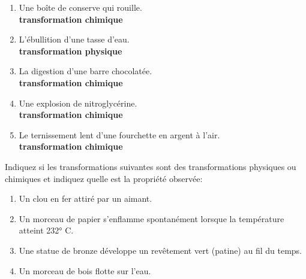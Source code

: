 \documentclass[
  11pt,
  french,
  a4paper,
  openany]{book}
\providecommand{\tightlist}{%
  \setlength{\itemsep}{0pt}\setlength{\parskip}{0pt}}
\begin{document}
\begin{Answer}

\begin{enumerate}
\def\labelenumi{\arabic{enumi}.}
\tightlist
\item
  Une boîte de conserve qui rouille.\\
  \textbf{transformation chimique}
\item
  L'ébullition d'une tasse d'eau.\\
  \textbf{transformation physique}
\item
  La digestion d'une barre chocolatée.\\
  \textbf{transformation chimique}
\item
  Une explosion de nitroglycérine.\\
  \textbf{transformation chimique}
\item
  Le ternissement lent d'une fourchette en argent à l'air.\\
  \textbf{transformation chimique}
\end{enumerate}


\end{Answer}

\begin{Exercise}

Indiquez si les transformations suivantes sont des transformations physiques ou chimiques et indiquez quelle est la propriété observée:

\begin{enumerate}
\def\labelenumi{\arabic{enumi}.}
\tightlist
\item
  Un clou en fer attiré par un aimant.\\
\item
  Un morceau de papier s'enflamme spontanément lorsque la température atteint 232° C.\\
\item
  Une statue de bronze développe un revêtement vert (patine) au fil du temps.\\
\item
  Un morceau de bois flotte sur l'eau.
\end{enumerate}


\end{Exercise}
\end{document}
